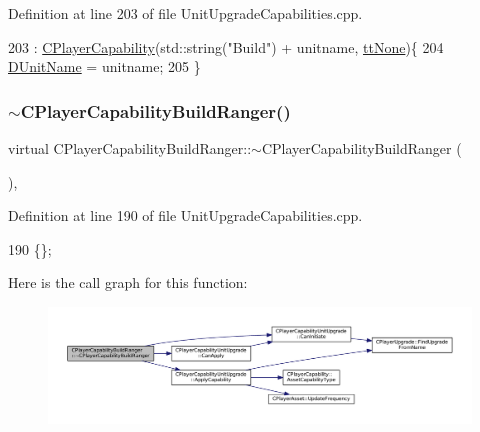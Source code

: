 Definition at line 203 of file Unit\+Upgrade\+Capabilities.\+cpp.


\begin{DoxyCode}
203                                                                                     : 
      \hyperlink{classCPlayerCapability_a303de62aba5d3f65d9a8e013c64a96c1}{CPlayerCapability}(std::string(\textcolor{stringliteral}{"Build"}) + unitname, \hyperlink{classCPlayerCapability_a9d3450ed1532fd536bd6cbb1e2eef02fac78f0e806a6b0ead030d63c27c9ce929}{ttNone})\{
204     \hyperlink{classCPlayerCapabilityBuildRanger_a4e85674699365fe1e77bcb2a1996d7ba}{DUnitName} = unitname;
205 \}
\end{DoxyCode}
\hypertarget{classCPlayerCapabilityBuildRanger_a624146c70790e8a3d85db28a42a466d2}{}\label{classCPlayerCapabilityBuildRanger_a624146c70790e8a3d85db28a42a466d2} 
\subsubsection{\texorpdfstring{$\sim$\+C\+Player\+Capability\+Build\+Ranger()}{~CPlayerCapabilityBuildRanger()}}
{\footnotesize\ttfamily virtual C\+Player\+Capability\+Build\+Ranger\+::$\sim$\+C\+Player\+Capability\+Build\+Ranger (\begin{DoxyParamCaption}{ }\end{DoxyParamCaption})\hspace{0.3cm}{\ttfamily [inline]}, {\ttfamily [virtual]}}



Definition at line 190 of file Unit\+Upgrade\+Capabilities.\+cpp.


\begin{DoxyCode}
190 \{\};
\end{DoxyCode}
Here is the call graph for this function\+:\nopagebreak
\begin{figure}[H]
\begin{center}
\leavevmode
\includegraphics[width=350pt]{classCPlayerCapabilityBuildRanger_a624146c70790e8a3d85db28a42a466d2_cgraph}
\end{center}
\end{figure}


